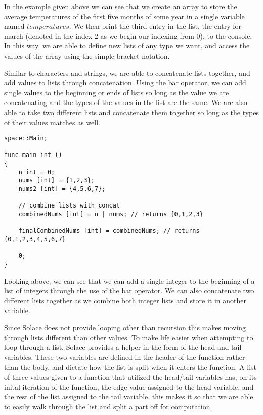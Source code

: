 \documentclass{article}
\begin{document}
In the example given above we can see that we create an array to store the average temperatures of the first five months of some year in a single variable named $temperatures$.
We then print the third entry in the list, the entry for march (denoted in the index 2 as we begin our indexing from 0), to the console. In this way, we are able to define
new lists of any type we want, and access the values of the array using the simple bracket notation.

Similar to characters and strings, we are able to concatenate lists together, and add values to lists through concatenation. Using the bar operator, we can add single
values to the beginning or ends of lists so long as the value we are concatenating and the types of the values in the list are the same. We are also able to take two
different lists and concatenate them together so long as the types of their values matches as well.

\begin{lstlisting}
space::Main;

func main int ()
{
	n int = 0;
	nums [int] = {1,2,3};
	nums2 [int] = {4,5,6,7};

	// combine lists with concat
	combinedNums [int] = n | nums; // returns {0,1,2,3}

	finalCombinedNums [int] = combinedNums; // returns {0,1,2,3,4,5,6,7}

	0;
}
\end{lstlisting}

Looking above, we can see that we can add a single integer to the beginning of a list of integers through the use of the bar operator. We can also concatenate two
different lists together as we combine both integer lists and store it in another variable.

Since Solace does not provide looping other than recursion this makes moving through lists different than other values. To make life easier when attempting to loop
through a list, Solace provides a helper in the form of the head and tail variables. These two variables are defined in the header of the function rather than the
body, and dictate how the list is split when it enters the function. A list of three values given to a function that utilized the head/tail variables has, on its
inital iteration of the function, the edge value assigned to the head variable, and the rest of the list assigned to the tail variable. this makes it so that 
we are able to easily walk through the list and split a part off for computation.
\end{document}

